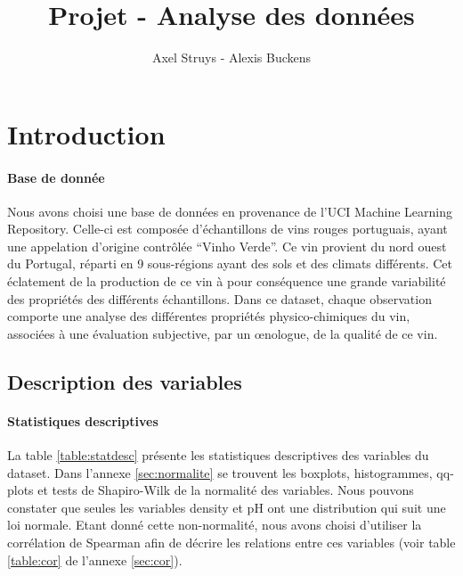\documentclass[11pt,a4paper]{article}
\author{Axel Struys - Alexis Buckens}
\title{Projet - Analyse des données}
\begin{document}
\maketitle

\section{Introduction}
\paragraph{Base de donnée}
Nous avons choisi une base de données en provenance de l'UCI Machine Learning Repository. Celle-ci est composée d'échantillons de vins rouges portuguais, ayant une appelation d'origine contrôlée ``Vinho Verde''. Ce vin provient du nord ouest du Portugal, réparti en 9 sous-régions ayant des sols et des climats différents. Cet éclatement de la production de ce vin à pour conséquence une grande variabilité des propriétés des différents échantillons. Dans ce dataset, chaque observation comporte une analyse des différentes propriétés physico-chimiques du vin, associées à une évaluation subjective, par un \oe nologue, de la qualité de ce vin.

\subsection{Description des variables}
\paragraph{Statistiques descriptives}
La table \ref{table:statdesc} présente les statistiques descriptives des variables du dataset.
Dans l'annexe \ref{sec:normalite} se trouvent les boxplots, histogrammes, qq-plots et tests de Shapiro-Wilk de la normalité des variables. Nous pouvons constater que seules les variables density et pH ont une distribution qui suit une loi normale. Etant donné cette non-normalité, nous avons choisi d'utiliser la corrélation de Spearman afin de décrire les relations entre ces variables (voir table \ref{table:cor} de l'annexe \ref{sec:cor}).
\end{document}
